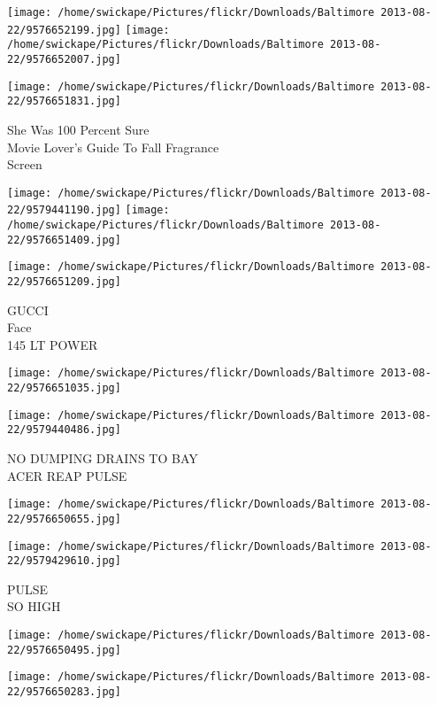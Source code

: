\documentclass[10pt,letterpaper]{article}
\begin{document}
\texttt{[image: /home/swickape/Pictures/flickr/Downloads/Baltimore 2013-08-22/9576652199.jpg]}
\texttt{[image: /home/swickape/Pictures/flickr/Downloads/Baltimore 2013-08-22/9576652007.jpg]}

\vspace{0.25in}
\texttt{[image: /home/swickape/Pictures/flickr/Downloads/Baltimore 2013-08-22/9576651831.jpg]}

She Was 100 Percent Sure\\
Movie Lover's Guide To Fall Fragrance\\
Screen\\
\pagebreak

\texttt{[image: /home/swickape/Pictures/flickr/Downloads/Baltimore 2013-08-22/9579441190.jpg]}
\texttt{[image: /home/swickape/Pictures/flickr/Downloads/Baltimore 2013-08-22/9576651409.jpg]}

\texttt{[image: /home/swickape/Pictures/flickr/Downloads/Baltimore 2013-08-22/9576651209.jpg]}

GUCCI\\
Face\\
145 LT POWER\\
\pagebreak

\texttt{[image: /home/swickape/Pictures/flickr/Downloads/Baltimore 2013-08-22/9576651035.jpg]}

\vspace{0.25in}
\texttt{[image: /home/swickape/Pictures/flickr/Downloads/Baltimore 2013-08-22/9579440486.jpg]}

NO DUMPING DRAINS TO BAY\\
ACER REAP PULSE\\
\pagebreak

\texttt{[image: /home/swickape/Pictures/flickr/Downloads/Baltimore 2013-08-22/9576650655.jpg]}

\vspace{0.25in}
\texttt{[image: /home/swickape/Pictures/flickr/Downloads/Baltimore 2013-08-22/9579429610.jpg]}

PULSE\\
SO HIGH\\
\pagebreak

\texttt{[image: /home/swickape/Pictures/flickr/Downloads/Baltimore 2013-08-22/9576650495.jpg]}

\vspace{0.25in}
\texttt{[image: /home/swickape/Pictures/flickr/Downloads/Baltimore 2013-08-22/9576650283.jpg]}
\end{document}
